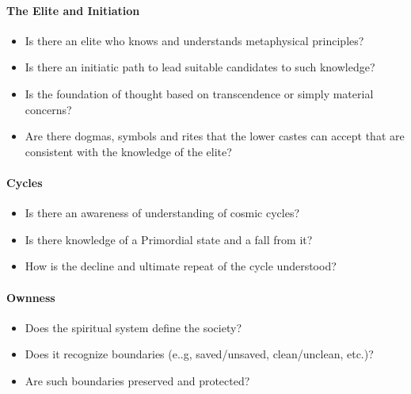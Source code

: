 \paragraph{The Elite and Initiation}


\begin{itemize}


\item Is there an elite who knows and understands metaphysical principles?

\item Is there an initiatic path to lead suitable candidates to such knowledge?

\item Is the foundation of thought based on transcendence or simply material concerns?

\item Are there dogmas, symbols and rites that the lower castes can accept that are consistent with the knowledge of the elite?
\end{itemize}


\paragraph{Cycles}


\begin{itemize}


\item Is there an awareness of understanding of cosmic cycles?

\item Is there knowledge of a Primordial state and a fall from it?

\item How is the decline and ultimate repeat of the cycle understood?
\end{itemize}


\paragraph{Ownness}


\begin{itemize}


\item Does the spiritual system define the society?

\item Does it recognize boundaries (e..g, saved/unsaved, clean/unclean, etc.)?

\item Are such boundaries preserved and protected?
\end{itemize}


